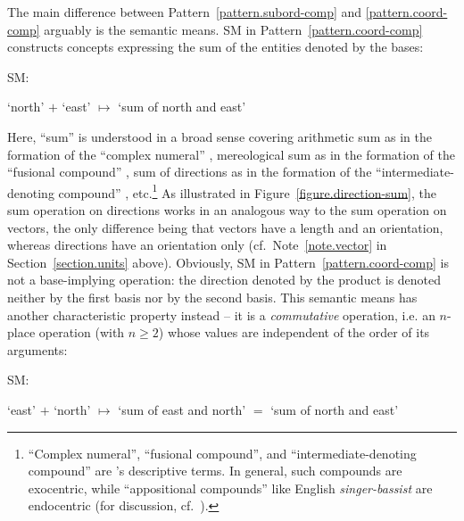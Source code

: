 \documentclass[output=paper
  ,nobabel
  ,draftmode
  ,colorlinks, citecolor=brown
]{langscibook}
\begin{document}
The main difference between Pattern \ref{pattern.subord-comp} and \ref{pattern.coord-comp} arguably is the semantic means. SM in Pattern \ref{pattern.coord-comp} constructs concepts expressing the
sum of the entities denoted by the bases: \begin{exe}
\ex \raggedright
\begin{labeledlist}{SM:}
\item[SM:] \raggedright ‘north’ $+$ ‘east’ $↦$ ‘sum of north and east’
\end{labeledlist}
\end{exe} 
Here, ``sum'' is understood in a broad
sense covering arithmetic sum as in the formation of the ``complex
numeral'' \emph{},
mereological sum as in the formation of the ``fusional
compound'' \emph{}, sum of directions as in the
formation of the ``intermediate-denoting compound'' \emph{}, etc.\footnote{``Complex numeral'', ``fusional
compound'', and ``intermediate-denoting
compound'' are \citeauthor{waelchli:2005:co-compounds:natural}’s \citeyearpar{waelchli:2005:co-compounds:natural} descriptive terms. In general,
such compounds are exocentric, while ``appositional compounds''
like English \emph{singer-bassist} are endocentric
(for discussion, cf.\ \citealt{olsen:2014:coordinative:structures}).} As illustrated in
Figure \ref{figure.direction-sum}, the sum operation on
directions works in an analogous way to the sum operation on vectors, the only
difference being that vectors have a length and an orientation, whereas
directions have an orientation only (cf.\ Note \ref{note.vector} in Section \ref{section.units}
above). Obviously, SM in Pattern \ref{pattern.coord-comp} is not a base-implying operation: the direction
denoted by the product is denoted neither by the first basis nor by the second
basis. This semantic means has another characteristic property instead – it is a
\emph{commutative} operation, i.e. an $n$-place operation (with $n≥2$) whose values are independent of the order of its arguments: \begin{exe}
\ex \raggedright
\begin{labeledlist}{SM:}
\item[SM:] \raggedright ‘east’ $+$ ‘north’ $↦$
‘sum of east and north’ $=$ ‘sum of north and east’
\end{labeledlist}
\end{exe}
\end{document}
